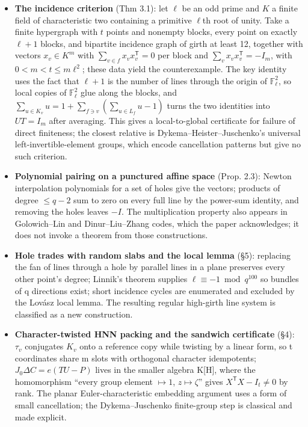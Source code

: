 \documentclass[11pt]{article}
\newcommand{\F}{\mathbb{F}}
\newcommand{\T}{\mathsf{T}}
\begin{document}
\begin{itemize}
\item \textbf{The incidence criterion} (Thm 3.1): let $\ell$ be an odd prime and $K$ a finite field of characteristic two containing a primitive $\ell$th root of unity. Take a finite hypergraph with $t$ points and nonempty blocks, every point on exactly $\ell+1$ blocks, and bipartite incidence graph of girth at least 12, together with vectors $x_v\in K^m$ with $\sum_{v\in f}x_vx_v^\T=0$ per block and $\sum_vx_vx_v^\T=-I_m$, with $0<m<t\le m\ell^2$; these data yield the counterexample. The key identity uses the fact that $\ell+1$ is the number of lines through the origin of $\F_\ell^2$, so local copies of $\F_\ell^2$ glue along the blocks, and $\sum_{u\in K_v}u=1+\sum_{f\ni v}(\sum_{u\in L_f}u-1)$ turns the two identities into $UT=I_m$ after averaging. This gives a local-to-global certificate for failure of direct finiteness; the closest relative is Dykema--Heister--Juschenko's universal left-invertible-element groups, which encode cancellation patterns but give no such criterion.
\item \textbf{Polynomial pairing on a punctured affine space} (Prop. 2.3): Newton interpolation polynomials for a set of holes give the vectors; products of degree $\le q-2$ sum to zero on every full line by the power-sum identity, and removing the holes leaves $-I$. The multiplication property also appears in Golowich--Lin and Dinur--Liu--Zhang codes, which the paper acknowledges; it does not invoke a theorem from those constructions.
\item \textbf{Hole trades with random slabs and the local lemma} (\S{}5): replacing the fan of lines through a hole by parallel lines in a plane preserves every other point's degree; Linnik's theorem supplies $\ell\equiv-1\bmod q^{100}$ so bundles of q directions exist; short incidence cycles are enumerated and excluded by the Lovász local lemma. The resulting regular high-girth line system is classified as a new construction.
\item \textbf{Character-twisted HNN packing and the sandwich certificate} (\S{}4): $\tau_v$ conjugates $K_v$ onto a reference copy while twisting by a linear form, so t coordinates share m slots with orthogonal character idempotents; $J_0\Delta C=e(TU-P)$ lives in the smaller algebra K[H], where the homomorphism ``every group element $\mapsto 1$, $z \mapsto \zeta$'' gives $X^\T X-I_t\ne0$ by rank. The planar Euler-characteristic embedding argument uses a form of small cancellation; the Dykema--Juschenko finite-group step is classical and made explicit.
\end{itemize}
\end{document}
